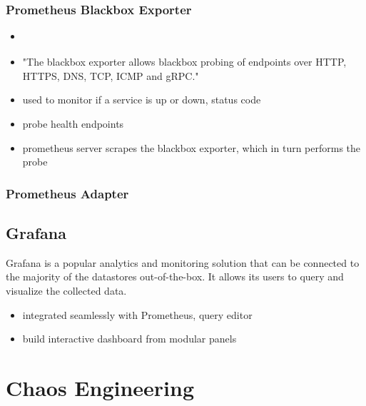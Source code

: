 \subsubsection{Prometheus Blackbox Exporter}

\begin{itemize}
	\item \cite{PrometheusBlackboxExporter}
	\item "The blackbox exporter allows blackbox probing of endpoints over HTTP, HTTPS, DNS, TCP, ICMP and gRPC."
	\item used to monitor if a service is up or down, status code
	\item probe health endpoints
	\item prometheus server scrapes the blackbox exporter, which in turn performs the probe
\end{itemize}

\subsubsection{Prometheus Adapter}


\subsection{Grafana}

Grafana is a popular analytics and monitoring solution that can be connected to the majority of the datastores out-of-the-box. It allows its users to query and visualize the collected data.

\begin{itemize}
	\item integrated seamlessly with Prometheus, query editor
	\item build interactive dashboard from modular panels
\end{itemize}

\section{Chaos Engineering}


